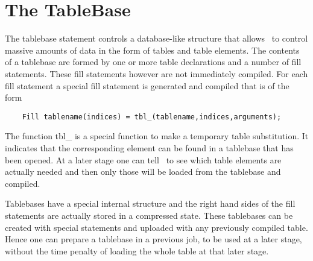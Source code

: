 
\chapter{The TableBase}
\label{tablebase}

The tablebase statement controls a 
database-like structure that allows \FORM\ to control massive 
amounts of data in the form of tables and
table elements.
The contents of a tablebase are formed by one or more table declarations 
and a number of fill statements. These fill statements however 
are not immediately compiled. For each fill statement a special fill 
statement is generated and compiled that is of the form
\begin{verbatim}
    Fill tablename(indices) = tbl_(tablename,indices,arguments);
\end{verbatim}
The function tbl\_ is a special function to make a temporary 
table substitution. It indicates that the corresponding element can be 
found in a tablebase that has been opened. At a later stage one can tell 
\FORM\ to see which table elements are actually needed and then only those 
will be loaded from the tablebase and compiled.

Tablebases have a special internal structure and the right hand sides of 
the fill statements are actually stored in a compressed 
state. These tablebases can be created with special statements and uploaded 
with any previously compiled table. Hence one can prepare a tablebase in a 
previous job, to be used at a later stage, without the time penalty of 
loading the whole table at that later stage.

